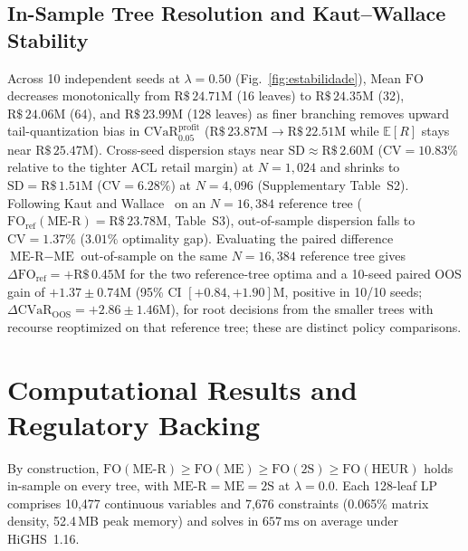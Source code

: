 \documentclass[10pt,journal]{IEEEtran}
\begin{document}
\subsection{In-Sample Tree Resolution and Kaut--Wallace Stability}
Across 10 independent seeds at $\lambda = 0.50$ (Fig.~\ref{fig:estabilidade}), Mean $\mathrm{FO}$ decreases monotonically from $\text{R\$}\,24.71\text{M}$ (16 leaves) to $\text{R\$}\,24.35\text{M}$ (32), $\text{R\$}\,24.06\text{M}$ (64), and $\text{R\$}\,23.99\text{M}$ (128 leaves) as finer branching removes upward tail-quantization bias in $\mathrm{CVaR}_{0.05}^{\mathrm{profit}}$ ($\text{R\$}\,23.87\text{M} \to \text{R\$}\,22.51\text{M}$ while $\mathbb{E}[R]$ stays near $\text{R\$}\,25.47\text{M}$). Cross-seed dispersion stays near $\text{SD} \approx \text{R\$}\,2.60\text{M}$ ($\text{CV} = 10.83\%$ relative to the tighter ACL retail margin) at $N = 1,024$ and shrinks to $\text{SD} = \text{R\$}\,1.51\text{M}$ ($\text{CV} = 6.28\%$) at $N = 4,096$ (Supplementary Table~S2). Following Kaut and Wallace~\cite{KautWallace2007} on an $N = 16,384$ reference tree ($\mathrm{FO}_{\text{ref}}(\text{ME-R}) = \text{R\$}\,23.78\text{M}$, Table~S3), out-of-sample dispersion falls to $\text{CV} = 1.37\%$ ($3.01\%$ optimality gap). Evaluating the paired difference $\text{ME-R} - \text{ME}$ out-of-sample on the same $N = 16,384$ reference tree gives $\Delta\mathrm{FO}_{\text{ref}} = +\text{R\$}\,0.45\text{M}$ for the two reference-tree optima and a 10-seed paired OOS gain of $+1.37 \pm 0.74\text{M}$ (95\% CI $[+0.84, +1.90]\text{M}$, positive in 10/10 seeds; $\Delta\mathrm{CVaR}_{\text{OOS}} = +2.86 \pm 1.46\text{M}$), for root decisions from the smaller trees with recourse reoptimized on that reference tree; these are distinct policy comparisons.

\section{Computational Results and Regulatory Backing}
\label{sec:results}

By construction, $\mathrm{FO}(\text{ME-R}) \ge \mathrm{FO}(\text{ME}) \ge \mathrm{FO}(\text{2S}) \ge \mathrm{FO}(\text{HEUR})$ holds in-sample on every tree, with $\text{ME-R} = \text{ME} = \text{2S}$ at $\lambda = 0.0$. Each 128-leaf LP comprises 10,477 continuous variables and 7,676 constraints (0.065\% matrix density, 52.4\,MB peak memory) and solves in $657\,\text{ms}$ on average under HiGHS~1.16.
\end{document}
